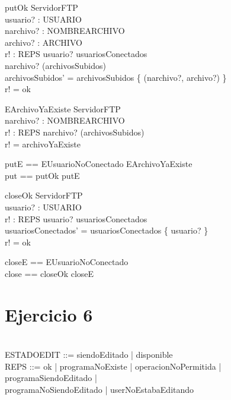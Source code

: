 \documentclass[11pt]{article}
\begin{document}
  \begin{schema}{putOk}
  \Delta ServidorFTP \\
  usuario? : USUARIO \\
  narchivo? : NOMBREARCHIVO \\
  archivo? : ARCHIVO \\
  r! : REPS
  \where
  usuario? \in usuariosConectados \\
  narchivo? \notin (\dom archivosSubidos) \\
  archivosSubidos' = archivosSubidos \cup \{ (narchivo?, archivo?) \} \\
  r! = ok
  \end{schema}
  
  \begin{schema}{EArchivoYaExiste}
  \Xi ServidorFTP \\
  narchivo? : NOMBREARCHIVO \\
  r! : REPS
  \where
  narchivo? \in (\dom archivosSubidos) \\
  r! = archivoYaExiste
  \end{schema}
  
  \begin{zed}
  putE == EUsuarioNoConectado \lor EArchivoYaExiste \\
  put == putOk \lor putE
  \end{zed}
  
  \begin{schema}{closeOk}
  \Delta ServidorFTP \\
  usuario? : USUARIO \\
  r! : REPS
  \where
  usuario? \in usuariosConectados \\
  usuariosConectados' = usuariosConectados \setminus \{ usuario? \} \\
  r! = ok
  \end{schema}
  
  \begin{zed}
  closeE == EUsuarioNoConectado \\
  close == closeOk \lor closeE
  \end{zed}


\section*{Ejercicio 6}

\begin{zed}
   \\
  ESTADOEDIT ::= siendoEditado | disponible \\
  REPS ::= ok | programaNoExiste | operacionNoPermitida | programaSiendoEditado | \\
  \; \; programaNoSiendoEditado | userNoEstabaEditando
  \end{zed}
  
\end{document}
